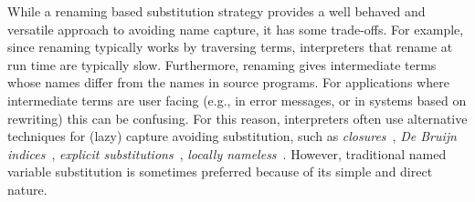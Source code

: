 While a renaming based substitution strategy provides a well behaved and versatile approach to avoiding name capture, it has some trade-offs.
For example, since renaming typically works by traversing terms, interpreters that rename at run time are typically slow.
Furthermore, renaming gives intermediate terms whose names differ from the names in source programs.
For applications where intermediate terms are user facing (e.g., in error messages, or in systems based on rewriting) this can be confusing.
For this reason, interpreters often use alternative techniques for (lazy) capture avoiding substitution, such as \emph{closures}~\cite{Landin64}, \emph{De Bruijn indices}~\cite{de_Bruijn_1972}, \emph{explicit substitutions}~\cite{AbadiCCL91}, \emph{locally nameless}~\cite{Chargueraud12}.
However, traditional named variable substitution is sometimes preferred because of its simple and direct nature.

